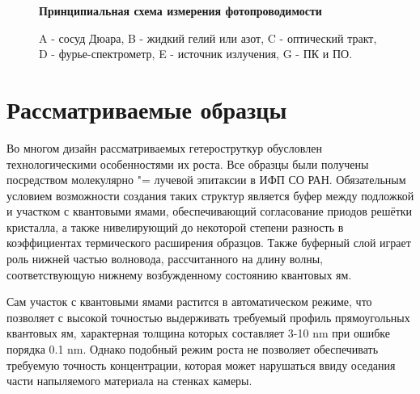 \documentclass[../main.tex]{subfiles}
\begin{document}
\begin{figure}[h]
\begin{minipage}[h]{\linewidth}
\begin{center}
            \vspace{0.75cm}
            
            \textbf{Принципиальная схема измерения фотопроводимости}

            A - сосуд Дюара, B - жидкий гелий или азот, C - оптический тракт, D - фурье-спектрометр, 
            E - источник излучения, G - ПК и ПО.

            \vspace{1.25cm}
        \end{center}
        \end{minipage}
    \end{figure}

    \section{Рассматриваемые образцы}

    Во многом дизайн рассматриваемых гетероструткур обусловлен технологическими особенностями их роста.
    Все образцы были получены посредством молекулярно "= лучевой эпитаксии в ИФП СО РАН.
    Обязательным условием возможности создания таких структур является буфер между подложкой 
    и участком с квантовыми ямами, обеспечивающий согласование приодов решётки кристалла, а также нивелирующий
    до некоторой степени разность в коэффициентах термического расширения образцов. Также буферный слой играет 
    роль нижней частью волновода, рассчитанного на длину волны, соответствующую нижнему возбужденному состоянию квантовых ям.

    Сам участок с квантовыми ямами растится в автоматическом режиме, что позволяет с высокой точностью выдерживать
    требуемый профиль прямоугольных квантовых ям, характерная толщина которых составляет 3-10 nm при ошибке порядка 0.1 nm.
    Однако подобный режим роста не позволяет обеспечивать требуемую точность концентрации, которая может нарушаться ввиду оседания
    части напыляемого материала на стенках камеры.
\end{document}

